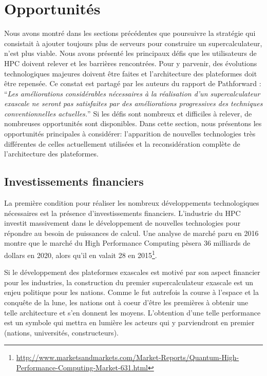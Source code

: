 \section{Opportunités}\label{sec:oppo}
    
    Nous avons montré dans les sections précédentes que poursuivre la stratégie qui consistait à ajouter toujours plus de serveurs pour construire un supercalculateur, n'est plus viable. Nous avons présenté les principaux défis que les utilisateurs de HPC doivent relever et les barrières rencontrées. Pour y parvenir, des évolutions technologiques majeures doivent être faites et l'architecture des plateformes doit être repensée.
    Ce constat est partagé par les auteurs du rapport de Pathforward \cite{Lucas2014}: ``\textit{Les améliorations considérables nécessaires à la réalisation d'un supercalculateur \gls{exascale} ne seront pas satisfaites par des améliorations progressives des techniques conventionnelles actuelles.}''
    Si les défis sont nombreux et difficiles à relever, de nombreuses opportunités sont disponibles. Dans cette section, nous présentons les opportunités principales à considérer: l'apparition de nouvelles technologies très différentes de celles actuellement utilisées et la reconsidération complète de l'architecture des plateformes. 


\subsection{Investissements financiers}

    La première condition pour réaliser les nombreux développements technologiques nécessaires est la présence d'investissements financiers. L'industrie du HPC investit massivement dans le développement de nouvelles technologies pour répondre au besoin de puissances de calcul. Une analyse de marché paru en 2016 montre que le marché du High Performance Computing pèsera 36 milliards de dollars en 2020, alors qu'il en valait 28 en 2015\footnote{\url{http://www.marketsandmarkets.com/Market-Reports/Quantum-High-Performance-Computing-Market-631.html}}.

    Si le développement des plateformes exascales est motivé par son aspect financier pour les industries, la construction du premier supercalculateur exascale est un enjeu politique pour les nations. Comme le fut autrefois la course à l'espace et la conquête de la lune, les nations ont à coeur d’être les premières à obtenir une telle architecture et s’en donnent les moyens. L’obtention d’une telle performance est un symbole qui mettra en lumière les acteurs qui y parviendront en premier (nations, universités, constructeurs).

